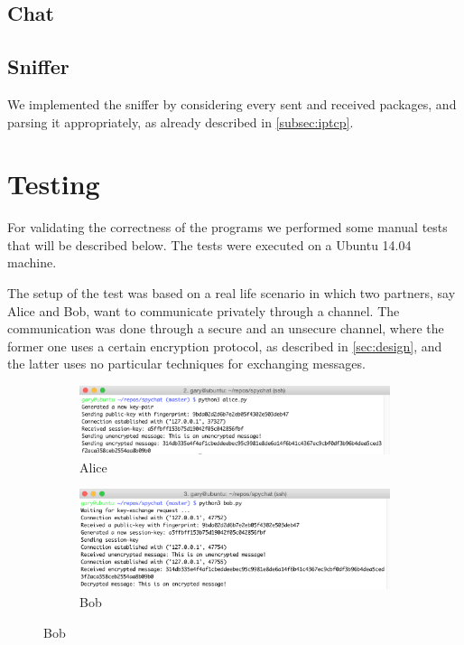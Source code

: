 \documentclass[11pt, a4paper]{article}
\begin{document}
\subsection{Chat}

\subsection{Sniffer}

We implemented the sniffer by considering every sent and received
packages, and parsing it appropriately, as already described in
\ref{subsec:iptcp}. 

\section{Testing}

For validating the correctness of the programs we performed some
manual tests that will be described below. The tests were executed on
a Ubuntu 14.04 machine. 

The setup of the test was based on a real life scenario in which two
partners, say Alice and Bob, want to communicate privately through a
channel. The communication was done through a secure and an unsecure
channel, where the former one uses a certain encryption protocol, as
described in \ref{sec:design}, and the latter uses no particular
techniques for exchanging messages.

\begin{figure}[H]
  \centering
  \begin{subfigure}[b]{0.49\textwidth}
    \includegraphics[width=\linewidth]{img/test_alice}
    \caption{Alice}
    \label{fig:test_alice}
  \end{subfigure}
  \begin{subfigure}[b]{0.49\textwidth}
    \includegraphics[width=\textwidth]{img/test_bob}
    \caption{Bob}
    \label{fig:test_bob}
  \end{subfigure}
\end{figure}
\end{document}
